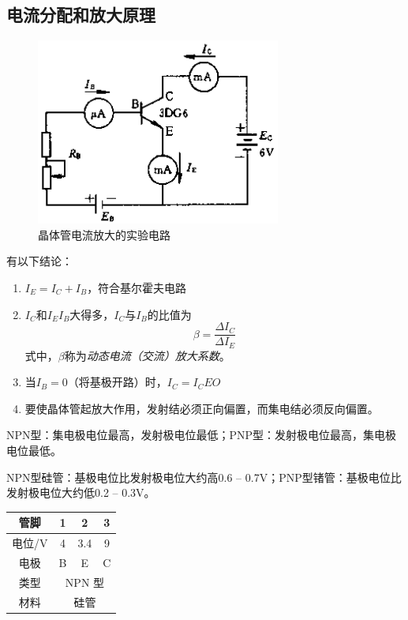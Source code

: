 \documentclass[12pt]{article}
\begin{document}
\subsection{电流分配和放大原理}

\begin{figure}[!h]
    \centering
    \includegraphics[width=.25\textwidth]{graphics/Screenshot 2025-09-28 at 06.44.14.png}
    \caption{晶体管电流放大的实验电路}
\end{figure}

有以下结论：

\begin{enumerate}
    \item $I_E = I_C + I_B$，符合基尔霍夫电路
    \item \(I_C\)和\(I_E\)\(I_B\)大得多，\(I_C\)与\(I_B\)的比值为
        \begin{equation}
        \beta = \frac{\Delta I_C}{\Delta I_E}
        \end{equation}式中，\(\beta\)称为\emph{动态电流（交流）放大系数}。
    \item 当$I_B = 0$（将基极开路）时，\(I_C = I_CEO\)
    \item 要使晶体管起放大作用，发射结必须正向偏置，而集电结必须反向偏置。
\end{enumerate}

NPN型：集电极电位最高，发射极电位最低；PNP型：发射极电位最高，集电极电位最低。

NPN型硅管：基极电位比发射极电位大约高0.6 -- 0.7V；PNP型锗管：基极电位比发射极电位大约低0.2 -- 0.3V。

\begin{table}[!h]
    \centering
    \begin{tabular}{c|c|c|c}
    \hline 管脚 & 1 & 2 & 3 \\
    \hline 电位/V & 4 & 3.4 & 9 \\
    \hline 电极 & B & E & C \\
    \hline 类型 & \multicolumn{3}{|c}{ NPN 型 } \\
    \hline 材料 & \multicolumn{3}{|c}{ 硅管 } \\
    \hline
    \end{tabular}
\end{table}
\end{document}
